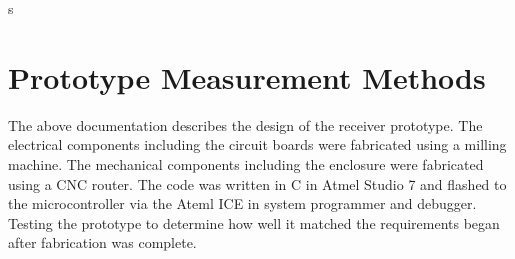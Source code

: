 \documentclass{article}
\begin{document}
s%


% 
% 

\newpage
\section{Prototype Measurement Methods}
	The above documentation describes the design of the receiver prototype.  The electrical components including the circuit boards were fabricated using a milling machine.  The mechanical components including the enclosure were fabricated using a CNC router.  The code was written in C in Atmel Studio 7 and flashed to the microcontroller via the Ateml ICE in system programmer and debugger.  Testing the prototype to determine how well it matched the requirements began after fabrication was complete.

	\color{black}
\end{document}
